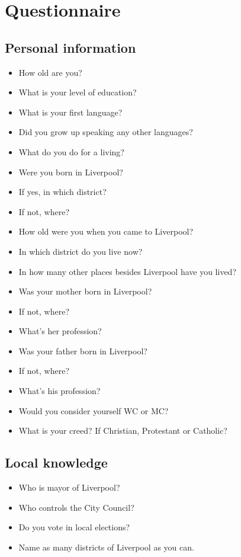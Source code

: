 \chapter{Questionnaire}
	\label{app.questionnaire}
{\raggedright 	
	\section*{Personal information}
		
		\begin{itemize}
			\item How old are you?
			\item What is your level of education? 
			\item What is your first language?
			\item Did you grow up speaking any other languages?
			\item What do you do for a living?
			\item Were you born in Liverpool?
			\item If yes, in which district?
			\item If not, where?
			\item How old were you when you came to Liverpool?
			\item In which district do you live now?
			\item In how many other places besides Liverpool have you lived?
			\item Was your mother born in Liverpool?
			\item If not, where?
			\item What's her profession?
			\item Was your father born in Liverpool?
			\item If not, where?
			\item What's his profession?
			\item Would you consider yourself WC or MC?
			\item What is your creed? If Christian, Protestant or Catholic?
		\end{itemize}
	
	
	\section*{Local knowledge}
	
		\begin{itemize}
			\item Who is mayor of Liverpool?
			\item Who controls the City Council?
			\item Do you vote in local elections?
			\item Name as many districts of Liverpool as you can.
		\end{itemize}
	
}
